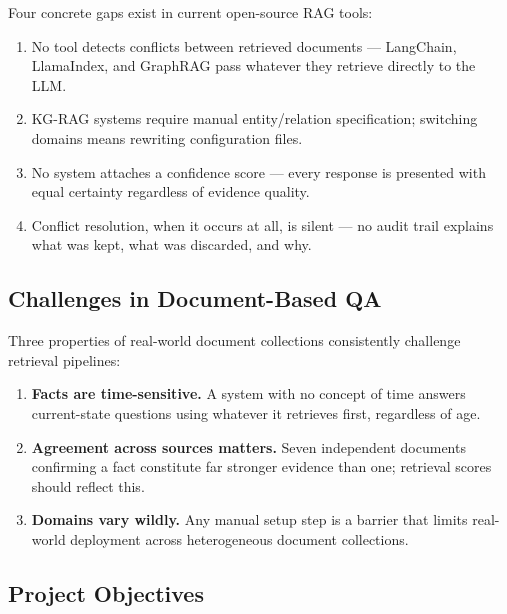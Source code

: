 Four concrete gaps exist in current open-source RAG tools:
\begin{enumerate}\itemsep0pt
    \item No tool detects conflicts between retrieved documents — LangChain,
    LlamaIndex, and GraphRAG pass whatever they retrieve directly to the LLM.
    \item KG-RAG systems require manual entity/relation specification; switching
    domains means rewriting configuration files.
    \item No system attaches a confidence score — every response is presented
    with equal certainty regardless of evidence quality.
    \item Conflict resolution, when it occurs at all, is silent — no audit trail
    explains what was kept, what was discarded, and why.
\end{enumerate}

\subsection{Challenges in Document-Based QA}

Three properties of real-world document collections consistently challenge
retrieval pipelines:
\begin{enumerate}\itemsep0pt
    \item \textbf{Facts are time-sensitive.} A system with no concept of time
    answers current-state questions using whatever it retrieves first, regardless of age.
    \item \textbf{Agreement across sources matters.} Seven independent documents
    confirming a fact constitute far stronger evidence than one; retrieval
    scores should reflect this.
    \item \textbf{Domains vary wildly.} Any manual setup step is a barrier that
    limits real-world deployment across heterogeneous document collections.
\end{enumerate}

\subsection{Project Objectives}

